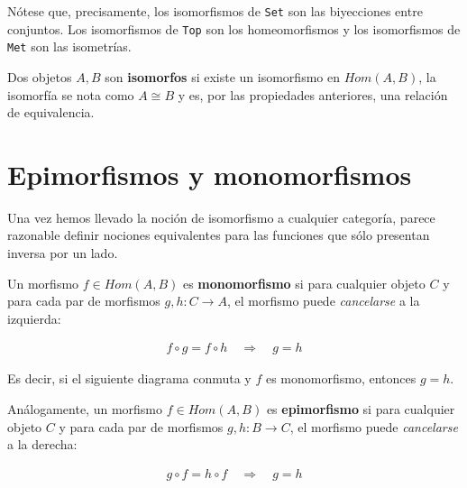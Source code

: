 \documentclass[11pt, fleqn, spanish]{book}
\begin{document}
Nótese que, precisamente, los isomorfismos de \texttt{Set} son las
biyecciones entre conjuntos.  Los isomorfismos de \texttt{Top} son los
homeomorfismos y los isomorfismos de \texttt{Met} son las isometrías.

\begin{definition}
  Dos objetos $A,B$ son \textbf{isomorfos} si existe un isomorfismo en
  $Hom(A,B)$, la isomorfía se nota como $A \cong B$ y es, por las
  propiedades anteriores, una relación de equivalencia.
\end{definition}


\section{Epimorfismos y monomorfismos}
Una vez hemos llevado la noción de isomorfismo a cualquier categoría, parece
razonable definir nociones equivalentes para las funciones que sólo presentan
inversa por un lado.

\begin{definition} 
  Un morfismo $f \in Hom(A,B)$ es \textbf{monomorfismo} si para
  cualquier objeto $C$ y para cada par de morfismos
  $g,h: C \rightarrow A$, el morfismo puede \textit{cancelarse} a la
  izquierda:
  
  \begin{gather*}
    f \circ g = f \circ h \quad \Rightarrow \quad g = h
  \end{gather*}
\end{definition}

Es decir, si el siguiente diagrama conmuta y $f$ es monomorfismo,
entonces $g=h$.

\begin{center}
\end{center}
    
\begin{definition} 
  Análogamente, un morfismo $f \in Hom(A,B)$ es \textbf{epimorfismo}
  si para cualquier objeto $C$ y para cada par de morfismos
  $g,h: B \rightarrow C$, el morfismo puede \textit{cancelarse} a la
  derecha:
  
  \begin{gather*}
    g \circ f = h \circ f \quad \Rightarrow \quad g = h
  \end{gather*}
\end{definition}
\end{document}
